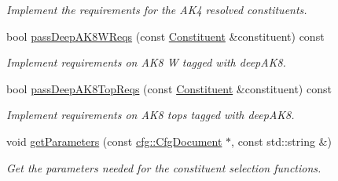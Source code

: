 \begin{DoxyCompactItemize}
\begin{DoxyCompactList}\small\item\em Implement the requirements for the A\-K4 resolved constituents. \end{DoxyCompactList}\item 
\hypertarget{classTTMConstituentReqs_ad315aa8b3bbcaa2194e515876f6ae85f}{bool \hyperlink{classTTMConstituentReqs_ad315aa8b3bbcaa2194e515876f6ae85f}{pass\-Deep\-A\-K8\-W\-Reqs} (const \hyperlink{classConstituent}{Constituent} \&constituent) const }\label{classTTMConstituentReqs_ad315aa8b3bbcaa2194e515876f6ae85f}

\begin{DoxyCompactList}\small\item\em Implement requirements on A\-K8 W tagged with deep\-A\-K8. \end{DoxyCompactList}\item 
\hypertarget{classTTMConstituentReqs_a3fa336ca887104b5ec315db546bb5b36}{bool \hyperlink{classTTMConstituentReqs_a3fa336ca887104b5ec315db546bb5b36}{pass\-Deep\-A\-K8\-Top\-Reqs} (const \hyperlink{classConstituent}{Constituent} \&constituent) const }\label{classTTMConstituentReqs_a3fa336ca887104b5ec315db546bb5b36}

\begin{DoxyCompactList}\small\item\em Implement requirements on A\-K8 tops tagged with deep\-A\-K8. \end{DoxyCompactList}\item 
\hypertarget{classTTMConstituentReqs_a6b72bd3d3605f24c240053a9ac0f36df}{void \hyperlink{classTTMConstituentReqs_a6b72bd3d3605f24c240053a9ac0f36df}{get\-Parameters} (const \hyperlink{classcfg_1_1CfgDocument}{cfg\-::\-Cfg\-Document} $\ast$, const std\-::string \&)}\label{classTTMConstituentReqs_a6b72bd3d3605f24c240053a9ac0f36df}

\begin{DoxyCompactList}\small\item\em Get the parameters needed for the constituent selection functions. \end{DoxyCompactList}\end{DoxyCompactItemize}
